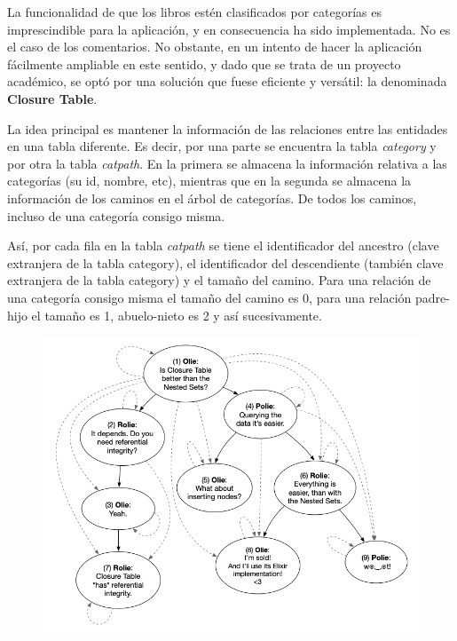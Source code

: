 \documentclass[a4paper]{report}
\begin{document}
    La funcionalidad de que los libros estén clasificados por categorías es imprescindible para la aplicación, y en consecuencia ha sido implementada. No es el caso de los comentarios. No obstante, en un intento de hacer la aplicación fácilmente ampliable en este sentido, y dado que se trata de un proyecto académico, se optó por una solución que fuese eficiente y versátil: la denominada \textbf{Closure Table}.
    
    La idea principal es mantener la información de las relaciones entre las entidades en una tabla diferente. Es decir, por una parte se encuentra la tabla \emph{category} y por otra la tabla \emph{catpath}. En la primera se almacena la información relativa a las categorías (su id, nombre, etc), mientras que en la segunda se almacena la información de los caminos en el árbol de categorías. De todos los caminos, incluso de una categoría consigo misma.
    
    Así, por cada fila en la tabla \emph{catpath} se tiene el identificador del ancestro (clave extranjera de la tabla category), el identificador del descendiente (también clave extranjera de la tabla category) y el tamaño del camino. Para una relación de una categoría consigo misma el tamaño del camino es 0, para una relación padre-hijo el tamaño es 1, abuelo-nieto es 2 y así sucesivamente.
    
    \begin{figure}[h]
    	\centering
    	\includegraphics[width=\textwidth]{closure_table}
    \end{figure}
    
\end{document}
